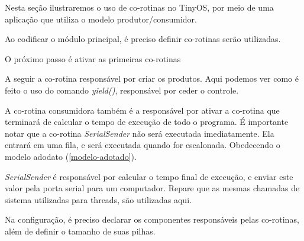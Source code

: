 Nesta seção ilustraremos o uso de co-rotinas no TinyOS, por meio de uma aplicação que utiliza o modelo produtor/consumidor.

Ao codificar o módulo principal, é preciso definir co-rotinas serão utilizadas.


O próximo passo é ativar as primeiras co-rotinas


A seguir a co-rotina responsável por criar os produtos. Aqui podemos ver como é feito o uso do comando \textit{yield()},
responsável por ceder o controle.


A co-rotina consumidora também é a responsável por ativar a co-rotina que terminará de calcular o tempo de execução de todo o
programa. É importante notar que a co-rotina \textit{SerialSender} não será executada imediatamente. Ela entrará em uma
fila, e será executada quando for escalonada. Obedecendo o modelo adodato (\ref{modelo-adotado}).


\textit{SerialSender} é responsável por calcular o tempo final de execução, e enviar este valor pela porta serial para um computador.
Repare que as mesmas chamadas de sistema utilizadas para threads, são utilizadas aqui.


Na configuração, é preciso declarar os componentes responsáveis pelas co-rotinas, além de definir o tamanho de suas pilhas.


